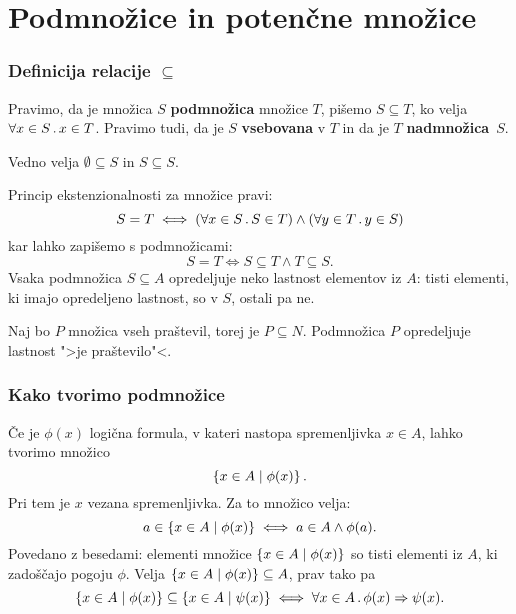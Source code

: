 \chapter{Podmnožice in potenčne množice}

\subsection{Definicija relacije $\subseteq$}

Pravimo, da je množica $S$ \textbf{podmnožica} množice $T$, pišemo $S \subseteq T$, ko velja $\forall x \in S \,.\, x \in T$. Pravimo tudi, da je $S$ \textbf{vsebovana} v $T$ in da je $T$ \textbf{nadmnožica}~$S$.

Vedno velja $\emptyset \subseteq S$ in $S \subseteq S$.

Princip ekstenzionalnosti za množice pravi:
%
\begin{equation*}
  S = T \iff (\forall x \in S \,.\, S \in T) \land (\forall y \in T \,.\, y \in S)
\end{equation*}
%
kar lahko zapišemo s podmnožicami:
%
\begin{equation*}
  S = T \iff S \subseteq T \land T \subseteq S.
\end{equation*}
%
Vsaka podmnožica $S \subseteq A$ opredeljuje neko lastnost elementov iz $A$: tisti
elementi, ki imajo opredeljeno lastnost, so v $S$, ostali pa ne.

\begin{zgled}
  Naj bo $P$ množica vseh praštevil, torej je $P \subseteq N$. Podmnožica $P$
  opredeljuje lastnost ">je praštevilo"<.
\end{zgled}


\subsection{Kako tvorimo podmnožice}

Če je $\phi(x)$ logična formula, v kateri nastopa spremenljivka $x \in A$, lahko tvorimo množico
%
\begin{equation*}
    \left\{ x \in A \; \middle| \; \phi(x) \right\}.
\end{equation*}
%
Pri tem je $x$ vezana spremenljivka. Za to množico velja:
%
\begin{equation*}
    a \in \left\{ x \in A \; \middle| \; \phi(x) \right\} \iff a \in A \land \phi(a).
\end{equation*}
%
Povedano z besedami: elementi množice $\left\{ x \in A \; \middle| \; \phi(x) \right\}$ so tisti elementi iz $A$, ki zadoščajo pogoju $\phi$.
%
Velja $\left\{ x \in A \; \middle| \; \phi(x) \right\} \subseteq A$, prav tako pa
\begin{equation*}
  \left\{x \in A \mid \phi(x)\right\} \subseteq \left\{x \in A \mid \psi(x)\right\} \iff
  \forall x \in A \,.\, \phi(x) \Rightarrow \psi(x).
\end{equation*}


